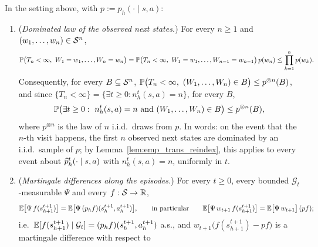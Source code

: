 \begin{lemma}\label{lem:visits_iid}
\leanok
{}
In the setting above, with $p := p_h(\cdot \mid s, a)$:
\begin{enumerate}
  \item[(i)] (\emph{Dominated law of the observed next states.}) For every $n \ge 1$ and
        $(w_1, \dots, w_n) \in \mathcal{S}^n$,
        \[
          \mathbb{P}\big(T_n < \infty,\ W_1 = w_1, \dots, W_n = w_n\big)
          = \mathbb{P}\big(T_n < \infty,\ W_1 = w_1, \dots, W_{n-1} = w_{n-1}\big)\,p(w_n)
          \le \prod_{k=1}^n p(w_k) .
        \]
        Consequently, for every $B \subseteq \mathcal{S}^n$,
        $\mathbb{P}\big(T_n < \infty,\ (W_1, \dots, W_n) \in B\big) \le p^{\otimes n}(B)$, and since
        $\{T_n < \infty\} = \{\exists t \ge 0 : n^t_h(s,a) = n\}$, for every $B$,
        \[
          \mathbb{P}\big(\exists t \ge 0 :\ n^t_h(s,a) = n \text{ and } (W_1, \dots, W_n) \in B\big)
          \le p^{\otimes n}(B) ,
        \]
        where $p^{\otimes n}$ is the law of $n$ i.i.d.\ draws from $p$. In words: on the event
        that the $n$-th visit happens, the first $n$ observed next states are dominated by an
        i.i.d.\ sample of $p$; by Lemma~\ref{lem:emp_trans_reindex}, this applies to every
        event about $\widehat{p}^t_h(\cdot \mid s,a)$ with $n^t_h(s,a) = n$, uniformly in $t$.
  \item[(ii)] (\emph{Martingale differences along the episodes.}) For every $t \ge 0$, every
        bounded $\mathcal G_t$-measurable $\Psi$ and every $f : \mathcal{S} \to \mathbb{R}$,
        \[
          \mathbb{E}\big[\Psi\, f(s^{t+1}_{h+1})\big] = \mathbb{E}\big[\Psi\,(p_h f)(s^{t+1}_h, a^{t+1}_h)\big] ,
          \qquad\text{in particular}\qquad
          \mathbb{E}\big[\Psi\, w_{t+1}\, f(s^{t+1}_{h+1})\big] = \mathbb{E}\big[\Psi\, w_{t+1}\big]\,(pf) ;
        \]
        i.e.\ $\mathbb{E}[f(s^{t+1}_{h+1}) \mid \mathcal G_t] = (p_h f)(s^{t+1}_h, a^{t+1}_h)$ a.s., and
        $w_{t+1}\big(f(s^{t+1}_{h+1}) - pf\big)$ is a martingale difference with respect to

\end{enumerate}
\end{lemma}
